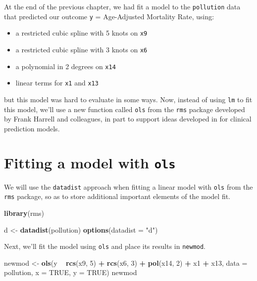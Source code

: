 \documentclass[]{book}
\newenvironment{Shaded}{\begin{snugshade}}{\end{snugshade}}
\newcommand{\KeywordTok}[1]{\textcolor[rgb]{0.13,0.29,0.53}{\textbf{#1}}}
\newcommand{\DataTypeTok}[1]{\textcolor[rgb]{0.13,0.29,0.53}{#1}}
\newcommand{\DecValTok}[1]{\textcolor[rgb]{0.00,0.00,0.81}{#1}}
\newcommand{\StringTok}[1]{\textcolor[rgb]{0.31,0.60,0.02}{#1}}
\newcommand{\OtherTok}[1]{\textcolor[rgb]{0.56,0.35,0.01}{#1}}
\newcommand{\OperatorTok}[1]{\textcolor[rgb]{0.81,0.36,0.00}{\textbf{#1}}}
\newcommand{\NormalTok}[1]{#1}
\providecommand{\tightlist}{%
  \setlength{\itemsep}{0pt}\setlength{\parskip}{0pt}}
\theoremstyle{definition}
\theoremstyle{definition}
\theoremstyle{definition}
\theoremstyle{remark}
\begin{document}
At the end of the previous chapter, we had fit a model to the
\texttt{pollution} data that predicted our outcome \texttt{y} =
Age-Adjusted Mortality Rate, using:

\begin{itemize}
\tightlist
\item
  a restricted cubic spline with 5 knots on \texttt{x9}
\item
  a restricted cubic spline with 3 knots on \texttt{x6}
\item
  a polynomial in 2 degrees on \texttt{x14}
\item
  linear terms for \texttt{x1} and \texttt{x13}
\end{itemize}

but this model was hard to evaluate in some ways. Now, instead of using
\texttt{lm} to fit this model, we'll use a new function called
\texttt{ols} from the \texttt{rms} package developed by Frank Harrell
and colleagues, in part to support ideas developed in
\citet{Harrell2001} for clinical prediction models.

\section{\texorpdfstring{Fitting a model with
\texttt{ols}}{Fitting a model with ols}}\label{fitting-a-model-with-ols}

We will use the \texttt{datadist} approach when fitting a linear model
with \texttt{ols} from the \texttt{rms} package, so as to store
additional important elements of the model fit.

\begin{Shaded}
\begin{Highlighting}[]
\KeywordTok{library}\NormalTok{(rms)}

\NormalTok{d <-}\StringTok{ }\KeywordTok{datadist}\NormalTok{(pollution)}
\KeywordTok{options}\NormalTok{(}\DataTypeTok{datadist =} \StringTok{"d"}\NormalTok{)}
\end{Highlighting}
\end{Shaded}

Next, we'll fit the model using \texttt{ols} and place its results in
\texttt{newmod}.

\begin{Shaded}
\begin{Highlighting}[]
\NormalTok{newmod <-}\StringTok{ }\KeywordTok{ols}\NormalTok{(y }\OperatorTok{~}\StringTok{ }\KeywordTok{rcs}\NormalTok{(x9, }\DecValTok{5}\NormalTok{) }\OperatorTok{+}\StringTok{ }\KeywordTok{rcs}\NormalTok{(x6, }\DecValTok{3}\NormalTok{) }\OperatorTok{+}\StringTok{ }\KeywordTok{pol}\NormalTok{(x14, }\DecValTok{2}\NormalTok{) }\OperatorTok{+}\StringTok{ }
\StringTok{                  }\NormalTok{x1 }\OperatorTok{+}\StringTok{ }\NormalTok{x13, }
              \DataTypeTok{data =}\NormalTok{ pollution, }\DataTypeTok{x =} \OtherTok{TRUE}\NormalTok{, }\DataTypeTok{y =} \OtherTok{TRUE}\NormalTok{)}
\NormalTok{newmod}
\end{Highlighting}
\end{Shaded}
\end{document}
